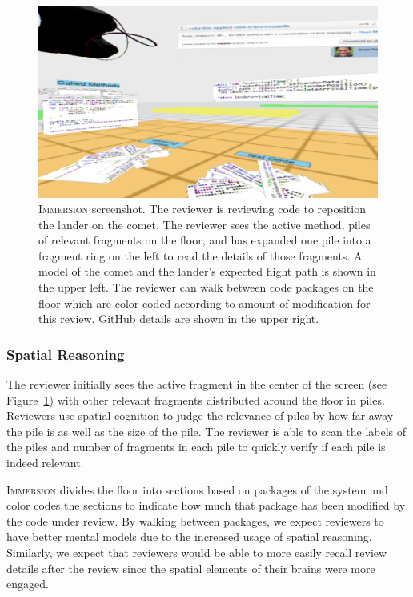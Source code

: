\documentclass[conference]{IEEEtran}
\begin{document}
\begin{figure}[ht]
\centering
\includegraphics[width=\linewidth]{figures/immersion_unwarped}
\caption{\textsc{Immersion} screenshot. The reviewer is reviewing code to reposition the lander on the comet. The reviewer sees the active method, piles of relevant fragments on the floor, and has expanded one pile into a fragment ring on the left to read the details of those fragments. A model of the comet and the lander's expected flight path is shown in the upper left. The reviewer can walk between code packages on the floor which are color coded according to amount of modification for this review. GitHub details are shown in the upper right. 
 \label{fig:Immersion}}
\end{figure}


\subsubsection{Spatial Reasoning}

The reviewer initially sees the active fragment in the center of the screen (see Figure~\ref{fig:Immersion}) with other relevant fragments distributed around the floor in piles. 
Reviewers use spatial cognition to judge the relevance of piles by how far away the pile is as well as the size of the pile.
The reviewer is able to scan the labels of the piles and number of fragments in each pile to quickly verify if each pile is indeed relevant.

\textsc{Immersion} divides the floor into sections based on packages of the system and color codes the sections to indicate how much that package has been modified by the code under review.
By walking between packages, we expect reviewers to have better mental models due to the increased usage of spatial reasoning.
Similarly, we expect that reviewers would be able to more easily recall review details after the review since the spatial elements of their brains were more engaged.
\end{document}
